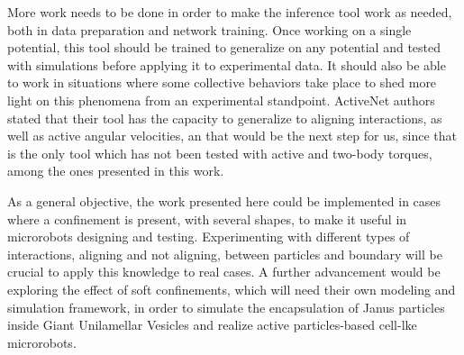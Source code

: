 \documentclass[../../master_thesis_np.tex]{subfiles}
\begin{document}
More work needs to be done in order to make the inference tool work as needed, both in data preparation and network training.
Once working on a single potential, this tool should be trained to generalize on any potential and tested with simulations before applying it to experimental data.
It should also be able to work in situations where some collective behaviors take place to shed more light on this phenomena from an experimental standpoint.
ActiveNet \cite{ruiz-garcia_discovering_2024} authors stated that their tool has the capacity to generalize to aligning interactions, as well as active angular velocities, an that would be the next step for us, since that is the only tool which has not been tested with active and two-body torques, among the ones presented in this work.

As a general objective, the work presented here could be implemented in cases where a confinement is present, with several shapes, to make it useful in microrobots designing and testing.
Experimenting with different types of interactions, aligning and not aligning, between particles and boundary will be crucial to apply this knowledge to real cases.
A further advancement would be exploring the effect of soft confinements, which will need their own modeling and simulation framework, in order to simulate the encapsulation of Janus particles inside Giant Unilamellar Vesicles and realize active particles-based cell-lke microrobots.

\end{document}
